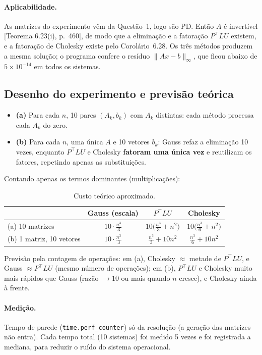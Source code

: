 \documentclass{article}
\newcommand{\T}{^{\top}}
\newcommand{\burden}[1]{\textsf{\footnotesize[#1]}}
\theoremstyle{remark}
\begin{document}
\paragraph{Aplicabilidade.} As matrizes do experimento vêm da Questão~1, logo são PD. Então $A$ é invertível
\burden{Teorema 6.23(i), p.~460}, de modo que a eliminação e a fatoração $P\T LU$ existem, e a fatoração de Cholesky
existe pelo Corolário~6.28. Os três métodos produzem a mesma solução; o programa confere o resíduo
$\|Ax-b\|_\infty$, que ficou abaixo de $5\times10^{-14}$ em todos os sistemas.

\subsection{Desenho do experimento e previsão teórica}
\begin{itemize}
\item \textbf{(a)} Para cada $n$, 10 pares $(A_k,b_k)$ com $A_k$ distintas: cada método processa cada $A_k$ do zero.
\item \textbf{(b)} Para cada $n$, uma única $A$ e 10 vetores $b_k$: Gauss refaz a eliminação 10 vezes, enquanto
$P\T LU$ e Cholesky \textbf{fatoram uma única vez} e reutilizam os fatores, repetindo apenas as substituições.
\end{itemize}
Contando apenas os termos dominantes (multiplicações):
\begin{table}[H]\centering
\begin{tabular}{@{}lccc@{}}\toprule
 & Gauss (escala) & $P\T LU$ & Cholesky\\\midrule
(a) 10 matrizes & $10\cdot\frac{n^3}{3}$ & $10\big(\frac{n^3}{3}+n^2\big)$ & $10\big(\frac{n^3}{6}+n^2\big)$\\
(b) 1 matriz, 10 vetores & $10\cdot\frac{n^3}{3}$ & $\frac{n^3}{3}+10n^2$ & $\frac{n^3}{6}+10n^2$\\\bottomrule
\end{tabular}
\caption{Custo teórico aproximado.}
\end{table}
\noindent Previsão pela contagem de operações: em (a), Cholesky $\approx$ metade de $P\T LU$, e Gauss $\approx P\T LU$ (mesmo número de operações);
em (b), $P\T LU$ e Cholesky muito mais rápidos que Gauss (razão $\to10$ ou mais quando $n$ cresce), e Cholesky ainda à frente.

\paragraph{Medição.} Tempo de parede (\texttt{time.perf\_counter}) só da resolução (a geração das matrizes não
entra). Cada tempo total (10 sistemas) foi medido 5 vezes e foi registrada a mediana, para reduzir o ruído do
sistema operacional.
\end{document}
